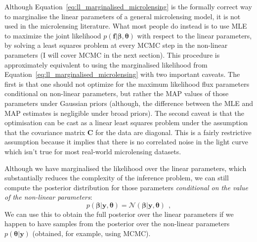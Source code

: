 \documentclass[12pt,dvipsnames]{report}
\renewcommand{\vec}[1]{\boldsymbol{\mathbf{#1}}}
\newcommand{\hquad}{~~}
\begin{document}
Although Equation~\ref{eq:ll_marginalised_microlensing} is the formally correct
way to marginalise the linear parameters of a general microlensing model, it is
not used in the microlensing literature. What most people do instead is to use 
MLE to maximize the joint likelihood $p(\vec{f}\lvert\vec\beta,\vec{\theta})$
with respect to the linear parameters, by solving a least squares problem at
every MCMC step in the non-linear parameters (I will cover MCMC in the next
section). This procedure is approximately equivalent to using the marginalised
likelihood from Equation~\ref{eq:ll_marginalised_microlensing} with two
important caveats. The first is that one should not optimize for the maximum
likelihood flux parameters conditional on non-linear parameters, but rather the
MAP values of those parameters under Gaussian priors (although, the difference
between the MLE and MAP estimates is negligible under broad priors). The second
caveat is that the optimisation can be cast as a linear least squares problem
under the assumption that the covariance matrix $\vec{C}$ for the data are  
diagonal. This is a fairly restrictive assumption because it implies that
there is no correlated noise in the light curve which isn't true for most real-world
microlensing datasets.

Although we have marginalised the likelihood over the linear parameters, which
substantially reduces the complexity of the inference problem, we can still
compute the posterior distribution for those parameters \emph{conditional on
    the value of the non-linear parameters}:
\begin{equation}
    p(\vec\beta\lvert \vec{y}, \vec{\theta})=\mathcal{N}(\vec\beta\lvert \vec{y}, \vec{\theta})
    \hquad,
\end{equation}
We can use this to obtain the full posterior over the linear parameters if we happen
to have samples from the posterior over the non-linear parameters $p(\vec{\theta}|\vec{y})$
(obtained, for example, using MCMC).
\end{document}
